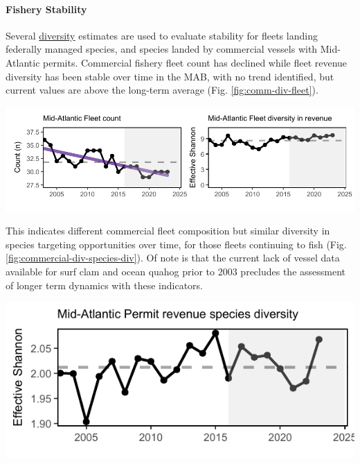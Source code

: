 \documentclass[
  10pt,
]{article}
\let\origfigure\figure
\let\endorigfigure\endfigure
\renewenvironment{figure}[1][2] {
    \expandafter\origfigure\expandafter[H]
} {
    \endorigfigure
}
\begin{document}
\paragraph{Fishery Stability}\label{fishery-stability}

Several \href{https://noaa-edab.github.io/catalog/commercial_div.html}{diversity} estimates are used to evaluate stability for fleets landing federally managed species, and species landed by commercial vessels with Mid-Atlantic permits. Commercial fishery fleet count has declined while fleet revenue diversity has been stable over time in the MAB, with no trend identified, but current values are above the long-term average (Fig. \ref{fig:comm-div-fleet}).

\begin{figure}

{\centering \includegraphics{midatlantic_files/figure-latex/comm-div-fleet-1} 

}

\caption{Commercial fleet count (left) and fleet diversity in revenue (right) in the Mid-Atlantic (black) with significant decline in fleet count (purple line).}\label{fig:comm-div-fleet}
\end{figure}

This indicates different commercial fleet composition but similar diversity in species targeting opportunities over time, for those fleets continuing to fish (Fig. \ref{fig:commercial-div-species-div}). Of note is that the current lack of vessel data available for surf clam and ocean quahog prior to 2003 precludes the assessment of longer term dynamics with these indicators.

\begin{figure}

{\centering \includegraphics{midatlantic_files/figure-latex/commercial-div-species-div-1} 

}

\caption{Species revenue diversity in the Mid Atlantic.}\label{fig:commercial-div-species-div}
\end{figure}
\end{document}
